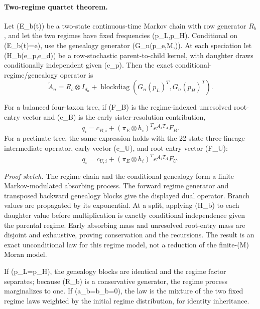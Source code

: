\paragraph{Two-regime quartet theorem.}
Let (E_b(t)) be a two-state continuous-time Markov chain with row generator
\(R_b\), and let the two regimes have fixed frequencies (p_L,p_H). Conditional
on (E_b(t)=e), use the genealogy generator (G_n(p_e,M,\rho)). At each
speciation let (H_b(e_p,e_d)) be a row-stochastic parent-to-child kernel,
with daughter draws conditionally independent given (e_p). Then the exact
conditional-regime/genealogy operator is
\[
\widetilde A_n=R_b\otimes I_{d_n}+
\operatorname{blockdiag}(G_n(p_L)^T,G_n(p_H)^T).
\]

For a balanced four-taxon tree, if (F_B) is the regime-indexed unresolved
root-entry vector and (c_B) is the early sister-resolution contribution,
\[
q_i=c_{B,i}+(\pi_E\otimes h_i)^T
e^{\widetilde A_4T_A}F_B.
\]
For a pectinate tree, the same expression holds with the 22-state
three-lineage intermediate operator, early vector (c_U), and root-entry
vector (F_U):
\[
q_i=c_{U,i}+(\pi_E\otimes h_i)^T
e^{\widetilde A_4T_A}F_U.
\]

\emph{Proof sketch.} The regime chain and the conditional genealogy form a
finite Markov-modulated absorbing process. The forward regime generator and
transposed backward genealogy blocks give the displayed dual operator. Branch
values are propagated by its exponential. At a split, applying (H_b) to each
daughter value before multiplication is exactly conditional independence given
the parental regime. Early absorbing mass and unresolved root-entry mass are
disjoint and exhaustive, proving conservation and the recursions. The result is
an exact unconditional law for this regime model, not a reduction of the
finite-(M) Moran model.

If (p_L=p_H), the genealogy blocks are identical and the regime factor
separates; because (R_b) is a conservative generator, the regime process
marginalizes to one. If (a_b=b_b=0), the law is the mixture of the two fixed
regime laws weighted by the initial regime distribution, for identity
inheritance.
